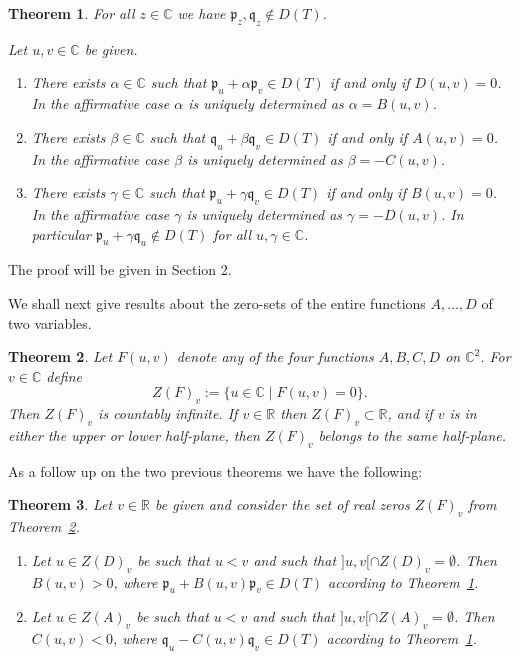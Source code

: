 \documentclass [12pt]{article}
\newtheorem{thm}{Theorem}[section]
\newcommand{\C}{\mathbb{C}}
\newcommand{\R}{\mathbb{R}}
\begin{document}
\begin{thm}\label{thm:pqmain} For all $z\in\C$ we have $\mathfrak{p}_z, \mathfrak{q}_z\notin D(T)$.

Let $u,v\in\C$ be given.
\begin{enumerate}
\item[(i)] There exists $\alpha\in\C$ such that $\mathfrak{p}_u+\alpha \mathfrak{p}_v\in D(T)$ if and only if $D(u,v)=0$. In the affirmative case $\alpha$  is uniquely determined as
$\alpha=B(u,v)$. 

\item[(ii)] There exists $\beta\in\C$ such that $\mathfrak{q}_u+\beta \mathfrak{q}_v\in D(T)$ if and only if $A(u,v)=0$. In the affirmative case $\beta$  is uniquely determined as $\beta=-C(u,v)$.

\item[(iii)] There exists $\gamma\in\C$ such that $\mathfrak{p}_u+\gamma \mathfrak{q}_v\in D(T)$ if and only if $B(u,v)=0$. In the affirmative case $\gamma$  is uniquely determined as $\gamma=-D(u,v)$. In particular $\mathfrak{p}_u+\gamma\mathfrak{q}_u\notin D(T)$ for all $u, \gamma\in\C$.
\end{enumerate}
\end{thm}

The proof will be given in Section 2.

We shall next give results about  the  zero-sets of the entire functions $A,\ldots,D$ of two variables.

\begin{thm}\label{thm:zeros} Let $F(u,v)$ denote any of the four functions $A,B,C,D$ on $\C^2$. For  $v\in\C$ define 
\begin{equation}\label{eq:zset}
Z(F)_v:=\{u\in\C \mid F(u,v)=0\}.
\end{equation}
Then $Z(F)_v$ is countably infinite. If $v\in\R$ then $Z(F)_v\subset \R$, and if $v$ is in either the upper or lower half-plane, then $Z(F)_v$ belongs to the same half-plane.
\end{thm}


As a follow up on the two previous theorems we have the following:
\begin{thm}\label{thm:pos} Let  $v\in\R$ be given and consider the set of real zeros $Z(F)_v$ from Theorem~\ref{thm:zeros}.
\begin{enumerate}
\item[(i)] Let $u\in Z(D)_v$ be such that $u<v$ and such that $]u,v[\cap Z(D)_v=\emptyset$. Then $B(u,v)>0$, where  $\mathfrak{p}_u+B(u,v)\mathfrak{p}_v\in D(T)$ according to Theorem~\ref{thm:pqmain}.
\item[(ii)] Let $u\in Z(A)_v$ be such that $u<v$ and such that $]u,v[\cap Z(A)_v=\emptyset$. Then $C(u,v)<0$, where  $\mathfrak{q}_u-C(u,v)\mathfrak{q}_v\in D(T)$ according to Theorem~\ref{thm:pqmain}.
\end{enumerate}
\end{thm}
\end{document}

